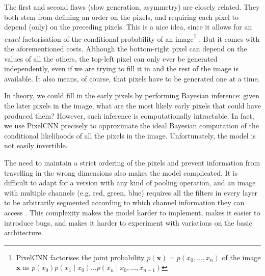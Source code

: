 \documentclass[11pt, a4paper, openany]{book}
\newcommand{\vect}[1]{\mathbf{#1}}
\begin{document}
The first and second flaws (slow generation, asymmetry) are closely related. They both stem from defining an order on the pixels, and requiring each pixel to depend (only) on the preceding pixels. This is a nice idea, since it allows for an \emph{exact} factorisation of the conditional probability of an image\footnote{PixelCNN factorises the joint probability $p(\vect{x})=p(x_0,\dots,x_n)$ of the image $\vect{x}$ as $p(x_0)p(x_1\mid x_0)\dots p(x_n\mid x_0,\dots,x_{n-1})$} \citep{pixelcnn1}. But it comes with the aforementioned costs. Although the bottom-right pixel can depend on the values of all the others, the top-left pixel can only ever be generated independently, even if we are trying to fill it in and the rest of the image is available. It also means, of course, that pixels have to be generated one at a time.

In theory, we could fill in the early pixels by performing Bayesian inference: given the later pixels in the image, what are the most likely early pixels that could have produced them? However, such inference is computationally intractable. In fact, we use PixelCNN precisely to approximate the ideal Bayesian computation of the conditional likelihoods of all the pixels in the image. Unfortunately, the model is not easily invertible.

The need to maintain a strict ordering of the pixels and prevent information from travelling in the wrong dimensions also makes the model complicated. It is difficult to adapt for a version with any kind of pooling operation, and an image with multiple channels (e.g. red, green, blue) requires all the filters in every layer to be arbitrarily segmented according to which channel information they can access \citep{pixelcnn2}. This complexity makes the model harder to implement, makes it easier to introduce bugs, and makes it harder to experiment with variations on the basic architecture.
\end{document}
